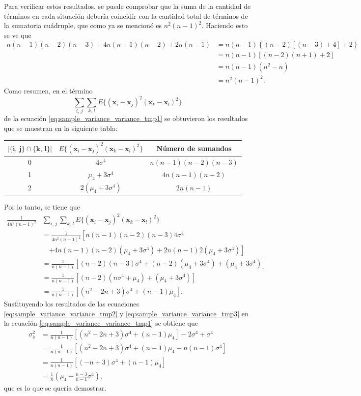 \documentclass[a4paper]{report}
\newcommand{\x}{\mathbf{x}}
\begin{document}
Para verificar estos resultados, se puede comprobar que la suma de la cantidad de términos en cada situación debería coincidir con la cantidad total de términos de la sumatoria cuádruple, que como ya se mencionó es \(n^2(n-1)^2\). Haciendo esto se ve que
\begin{align*}
  n(n-1)(n-2)(n-3)+4n(n-1)(n-2)+2n(n-1)&=n(n-1)\left\{(n-2)\left[(n-3)+4\right]+2\right\}\\
   &=n(n-1)\left[(n-2)(n+1)+2\right]\\
   &=n(n-1)(n^2-n)\\
   &=n^2(n-1)^2.
\end{align*}
Como resumen, en el término 
\[
 \sum_{i,\,j}\sum_{k,\,l}E\{(\x_i-\x_j)^2(\x_k-\x_l)^2\}
\]
de la ecuación \ref{eq:sample_variance_variance_tmp1} se obtuvieron los resultados que se muestran en la siguiente tabla:
\begin{center}
\def\arraystretch{1.2}
  \begin{tabular}{| c | c | c |}
    \hline
    \(\bm{|\{i,\,j\}\cap\{k,\,l\}|}\) & \(E\{(\x_i-\x_j)^2(\x_k-\x_l)^2\}\) & \textbf{Número de sumandos} \\ \hline
    0 & \(4\sigma^4\) & \(n(n-1)(n-2)(n-3)\) \\ \hline
    1 & \(\mu_4+3\sigma^4\) & \(4n(n-1)(n-2)\) \\ \hline
    2 & \(2(\mu_4+3\sigma^4)\) & \(2n(n-1)\) \\ \hline
  \end{tabular}
\end{center}
Por lo tanto, se tiene que
\begin{align}\label{eq:sample_variance_variance_tmp3}
 \frac{1}{4n^2(n-1)^2}&\sum_{i,\,j}\sum_{k,\,l}E\{(\x_i-\x_j)^2(\x_k-\x_l)^2\}\nonumber\\
 &=\frac{1}{4n^2(n-1)^2}\left[n(n-1)(n-2)(n-3)4\sigma^4\right.\nonumber\\
 &\quad\left.+4n(n-1)(n-2)(\mu_4+3\sigma^4)+2n(n-1)2(\mu_4+3\sigma^4)\right]\nonumber\\
 &=\frac{1}{n(n-1)}\left[(n-2)(n-3)\sigma^4+(n-2)(\mu_4+3\sigma^4)+(\mu_4+3\sigma^4)\right]\nonumber\\
 &=\frac{1}{n(n-1)}\left[(n-2)(n\sigma^4+\mu_4)+(\mu_4+3\sigma^4)\right]\nonumber\\
 &=\frac{1}{n(n-1)}\left[(n^2-2n+3)\sigma^4+(n-1)\mu_4\right].
\end{align}
Sustituyendo los resultados de las ecuaciones \ref{eq:sample_variance_variance_tmp2} y \ref{eq:sample_variance_variance_tmp3} en la ecuación \ref{eq:sample_variance_variance_tmp1} se obtiene que
\begin{align*}\label{eq:sample_variance_variance_tmp1}
 \sigma_{\bar{v}}^2&=\frac{1}{n(n-1)}\left[(n^2-2n+3)\sigma^4+(n-1)\mu_4\right]-2\sigma^4+\sigma^4\\
   &=\frac{1}{n(n-1)}\left[(n^2-2n+3)\sigma^4+(n-1)\mu_4-n(n-1)\sigma^4\right]\\
   &=\frac{1}{n(n-1)}\left[(-n+3)\sigma^4+(n-1)\mu_4\right]\\
   &=\frac{1}{n}\left(\mu_4-\frac{n-3}{n-1}\sigma^4\right),
\end{align*}
que es lo que se quería demostrar.
\end{document}
